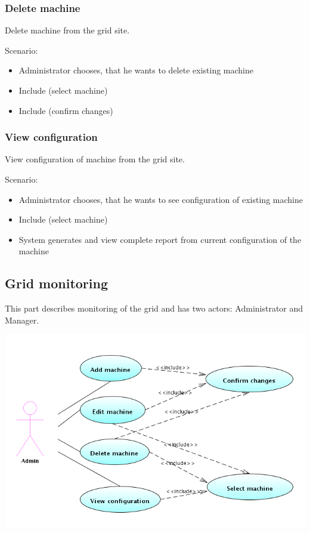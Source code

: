 \documentclass[12pt]{article}
\begin{document}
\subsubsection{Delete machine}
Delete machine from the grid site.

Scenario:
\begin{itemize}
\item{Administrator chooses, that he wants to delete existing machine}
\item{Include (select machine)}
\item{Include (confirm changes)}
\end{itemize}

\subsubsection{View configuration}
View configuration of machine from the grid site.

Scenario:
\begin{itemize}
\item{Administrator chooses, that he wants to see configuration of existing machine}
\item{Include (select machine)}
\item{System generates and view complete report from current configuration of the machine}
\end{itemize}

\subsection{Grid monitoring}
This part describes monitoring of the grid and has two actors: Administrator and Manager.

\includegraphics[width=\linewidth]{grid_managing.png}
\end{document}
